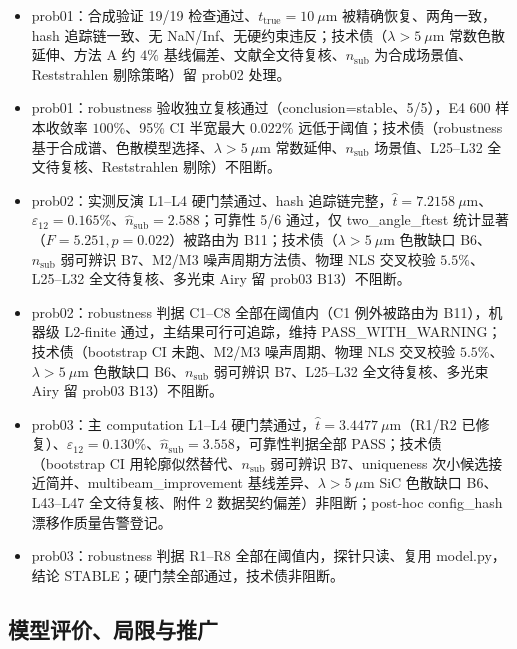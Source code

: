 \begin{itemize}
\tightlist
\item
  prob01：合成验证 19/19
  检查通过、\(t_{\mathrm{true}}=10\ \mu\mathrm{m}\)
  被精确恢复、两角一致，hash 追踪链一致、无
  NaN/Inf、无硬约束违反；技术债（\(\lambda>5\ \mu\mathrm{m}\)
  常数色散延伸、方法 A 约 \(4\%\)
  基线偏差、文献全文待复核、\(n_{\mathrm{sub}}\)
  为合成场景值、Reststrahlen 剔除策略）留 prob02 处理。
\item
  prob01：robustness 验收独立复核通过（conclusion=stable、5/5），E4 600
  样本收敛率 \(100\%\)、95\% CI 半宽最大 \(0.022\%\)
  远低于阈值；技术债（robustness
  基于合成谱、色散模型选择、\(\lambda>5\ \mu\mathrm{m}\)
  常数延伸、\(n_{\mathrm{sub}}\) 场景值、L25--L32
  全文待复核、Reststrahlen 剔除）不阻断。
\item
  prob02：实测反演 L1--L4 硬门禁通过、hash
  追踪链完整，\(\hat t=7.2158\ \mu\mathrm{m}\)、\(\varepsilon_{12}=0.165\%\)、\(\hat n_{\mathrm{sub}}=2.588\)；可靠性
  5/6 通过，仅 two\_angle\_ftest 统计显著（\(F=5.251,p=0.022\)）被路由为
  B11；技术债（\(\lambda>5\ \mu\mathrm{m}\) 色散缺口
  B6、\(n_{\mathrm{sub}}\) 弱可辨识 B7、M2/M3 噪声周期方法债、物理 NLS
  交叉校验 \(5.5\%\)、L25--L32 全文待复核、多光束 Airy 留 prob03
  B13）不阻断。
\item
  prob02：robustness 判据 C1--C8 全部在阈值内（C1 例外被路由为
  B11），机器级 L2-finite 通过，主结果可行可追踪，维持
  PASS\_WITH\_WARNING；技术债（bootstrap CI 未跑、M2/M3 噪声周期、物理
  NLS 交叉校验 \(5.5\%\)、\(\lambda>5\ \mu\mathrm{m}\) 色散缺口
  B6、\(n_{\mathrm{sub}}\) 弱可辨识 B7、L25--L32 全文待复核、多光束 Airy
  留 prob03 B13）不阻断。
\item
  prob03：主 computation L1--L4
  硬门禁通过，\(\hat t=3.4477\ \mu\mathrm{m}\)（R1/R2
  已修复）、\(\varepsilon_{12}=0.130\%\)、\(\hat n_{\mathrm{sub}}=3.558\)，可靠性判据全部
  PASS；技术债（bootstrap CI 用轮廓似然替代、\(n_{\mathrm{sub}}\)
  弱可辨识 B7、uniqueness 次小候选接近简并、multibeam\_improvement
  基线差异、\(\lambda>5\ \mu\mathrm{m}\) SiC 色散缺口 B6、L43--L47
  全文待复核、附件 2 数据契约偏差）非阻断；post-hoc config\_hash
  漂移作质量告警登记。
\item
  prob03：robustness 判据 R1--R8 全部在阈值内，探针只读、复用
  model.py，结论 STABLE；硬门禁全部通过，技术债非阻断。
\end{itemize}

\subsection{模型评价、局限与推广}\label{ux6a21ux578bux8bc4ux4ef7ux5c40ux9650ux4e0eux63a8ux5e7f}

